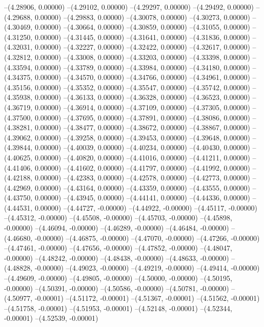 --(4.28906, 0.00000)
--(4.29102, 0.00000)
--(4.29297, 0.00000)
--(4.29492, 0.00000)
--(4.29688, 0.00000)
--(4.29883, 0.00000)
--(4.30078, 0.00000)
--(4.30273, 0.00000)
--(4.30469, 0.00000)
--(4.30664, 0.00000)
--(4.30859, 0.00000)
--(4.31055, 0.00000)
--(4.31250, 0.00000)
--(4.31445, 0.00000)
--(4.31641, 0.00000)
--(4.31836, 0.00000)
--(4.32031, 0.00000)
--(4.32227, 0.00000)
--(4.32422, 0.00000)
--(4.32617, 0.00000)
--(4.32812, 0.00000)
--(4.33008, 0.00000)
--(4.33203, 0.00000)
--(4.33398, 0.00000)
--(4.33594, 0.00000)
--(4.33789, 0.00000)
--(4.33984, 0.00000)
--(4.34180, 0.00000)
--(4.34375, 0.00000)
--(4.34570, 0.00000)
--(4.34766, 0.00000)
--(4.34961, 0.00000)
--(4.35156, 0.00000)
--(4.35352, 0.00000)
--(4.35547, 0.00000)
--(4.35742, 0.00000)
--(4.35938, 0.00000)
--(4.36133, 0.00000)
--(4.36328, 0.00000)
--(4.36523, 0.00000)
--(4.36719, 0.00000)
--(4.36914, 0.00000)
--(4.37109, 0.00000)
--(4.37305, 0.00000)
--(4.37500, 0.00000)
--(4.37695, 0.00000)
--(4.37891, 0.00000)
--(4.38086, 0.00000)
--(4.38281, 0.00000)
--(4.38477, 0.00000)
--(4.38672, 0.00000)
--(4.38867, 0.00000)
--(4.39062, 0.00000)
--(4.39258, 0.00000)
--(4.39453, 0.00000)
--(4.39648, 0.00000)
--(4.39844, 0.00000)
--(4.40039, 0.00000)
--(4.40234, 0.00000)
--(4.40430, 0.00000)
--(4.40625, 0.00000)
--(4.40820, 0.00000)
--(4.41016, 0.00000)
--(4.41211, 0.00000)
--(4.41406, 0.00000)
--(4.41602, 0.00000)
--(4.41797, 0.00000)
--(4.41992, 0.00000)
--(4.42188, 0.00000)
--(4.42383, 0.00000)
--(4.42578, 0.00000)
--(4.42773, 0.00000)
--(4.42969, 0.00000)
--(4.43164, 0.00000)
--(4.43359, 0.00000)
--(4.43555, 0.00000)
--(4.43750, 0.00000)
--(4.43945, 0.00000)
--(4.44141, 0.00000)
--(4.44336, 0.00000)
--(4.44531, 0.00000)
--(4.44727, -0.00000)
--(4.44922, -0.00000)
--(4.45117, -0.00000)
--(4.45312, -0.00000)
--(4.45508, -0.00000)
--(4.45703, -0.00000)
--(4.45898, -0.00000)
--(4.46094, -0.00000)
--(4.46289, -0.00000)
--(4.46484, -0.00000)
--(4.46680, -0.00000)
--(4.46875, -0.00000)
--(4.47070, -0.00000)
--(4.47266, -0.00000)
--(4.47461, -0.00000)
--(4.47656, -0.00000)
--(4.47852, -0.00000)
--(4.48047, -0.00000)
--(4.48242, -0.00000)
--(4.48438, -0.00000)
--(4.48633, -0.00000)
--(4.48828, -0.00000)
--(4.49023, -0.00000)
--(4.49219, -0.00000)
--(4.49414, -0.00000)
--(4.49609, -0.00000)
--(4.49805, -0.00000)
--(4.50000, -0.00000)
--(4.50195, -0.00000)
--(4.50391, -0.00000)
--(4.50586, -0.00000)
--(4.50781, -0.00000)
--(4.50977, -0.00001)
--(4.51172, -0.00001)
--(4.51367, -0.00001)
--(4.51562, -0.00001)
--(4.51758, -0.00001)
--(4.51953, -0.00001)
--(4.52148, -0.00001)
--(4.52344, -0.00001)
--(4.52539, -0.00001)
